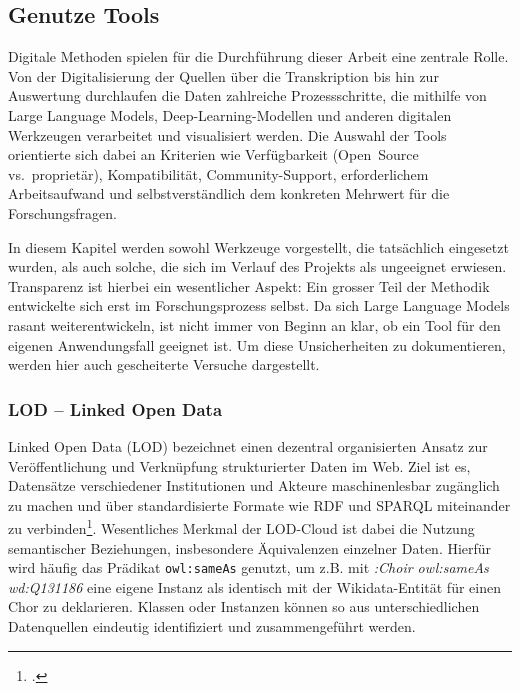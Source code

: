 \documentclass[12pt, a4paper, ngerman, bidi=default]{article}
\let\cite\footcite
\begin{document}
\subsection{Genutze Tools}
Digitale Methoden spielen für die Durchführung dieser Arbeit eine zentrale Rolle. Von der Digitalisierung der Quellen
über die Transkription bis hin zur Auswertung durchlaufen die Daten zahlreiche Prozessschritte, die mithilfe von Large 
Language Models, Deep-Learning-Modellen und anderen digitalen Werkzeugen verarbeitet und visualisiert werden. 
Die Auswahl der Tools orientierte sich dabei an Kriterien wie Verfügbarkeit (Open~Source vs.\ proprietär), 
Kompatibilität, Community-Support, erforderlichem Arbeitsaufwand und selbstverständlich dem konkreten Mehrwert für 
die Forschungsfragen.

In diesem Kapitel werden sowohl Werkzeuge vorgestellt, die tatsächlich eingesetzt wurden, als auch solche, die sich 
im Verlauf des Projekts als ungeeignet erwiesen. Transparenz ist hierbei ein wesentlicher Aspekt: Ein grosser Teil der 
Methodik entwickelte sich erst im Forschungsprozess selbst. Da sich Large Language Models rasant weiterentwickeln, 
ist nicht immer von Beginn an klar, ob ein Tool für den eigenen Anwendungsfall geeignet ist.
Um diese Unsicherheiten zu dokumentieren, werden hier auch gescheiterte Versuche dargestellt.

\subsubsection{LOD – Linked Open Data}

Linked Open Data (LOD) bezeichnet einen dezentral organisierten Ansatz zur Veröffentlichung und 
Verknüpfung strukturierter Daten im Web. Ziel ist es, Datensätze verschiedener Institutionen und Akteure 
maschinenlesbar zugänglich zu machen und über standardisierte Formate wie RDF und SPARQL miteinander zu 
verbinden\cite[ vgl.][Preface S. VI \& S. 13f]{garoufallou_metadata_2020}. 
Wesentliches Merkmal der LOD-Cloud ist dabei die Nutzung semantischer Beziehungen, insbesondere Äquivalenzen einzelner Daten. 
Hierfür wird häufig das Prädikat \texttt{owl:sameAs} genutzt, um z.B. mit \colorbox{VeryLightGray}{\textit{:Choir owl:sameAs wd:Q131186}} eine eigene 
Instanz als identisch mit der Wikidata-Entität für einen Chor zu deklarieren.
Klassen oder Instanzen können so aus unterschiedlichen Datenquellen eindeutig identifiziert und zusammengeführt werden.
\end{document}
